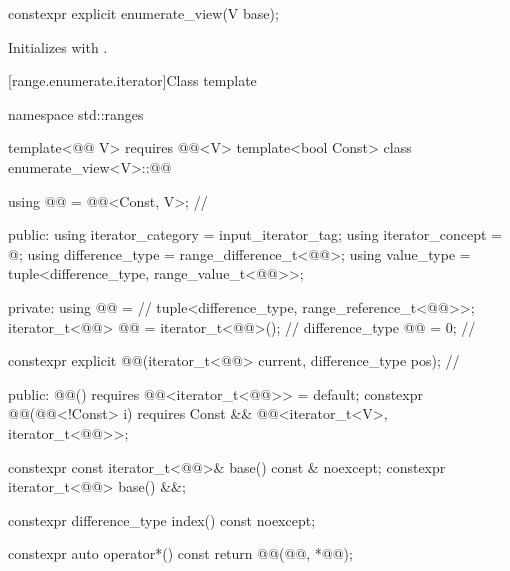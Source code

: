 \begin{itemdecl}
constexpr explicit enumerate_view(V base);
\end{itemdecl}

\begin{itemdescr}
\pnum
\effects
Initializes  with .
\end{itemdescr}

[range.enumerate.iterator]{Class template }

%
\begin{codeblock}
namespace std::ranges {
  template<@@ V>
    requires @@<V>
  template<bool Const>
  class enumerate_view<V>::@@ {
    using @@ = @@<Const, V>;                         // \expos

  public:
    using iterator_category = input_iterator_tag;
    using iterator_concept = @\seebelow@;
    using difference_type = range_difference_t<@@>;
    using value_type = tuple<difference_type, range_value_t<@@>>;

  private:
    using @@ =                                      // \expos
      tuple<difference_type, range_reference_t<@@>>;
    iterator_t<@@> @@ = iterator_t<@@>();             // \expos
    difference_type @@ = 0;                                   // \expos

    constexpr explicit
      @@(iterator_t<@@> current, difference_type pos);  // \expos

  public:
    @@() requires @@<iterator_t<@@>> = default;
    constexpr @@(@@<!Const> i)
      requires Const && @@<iterator_t<V>, iterator_t<@@>>;

    constexpr const iterator_t<@@>& base() const & noexcept;
    constexpr iterator_t<@@> base() &&;

    constexpr difference_type index() const noexcept;

    constexpr auto operator*() const {
      return @@(@@, *@@);
    }

}}
\end{codeblock}
